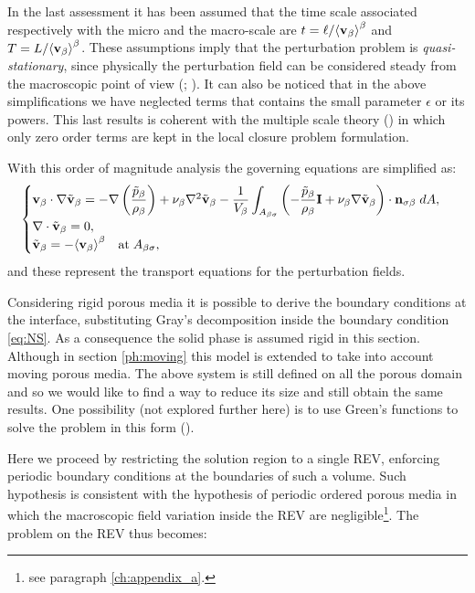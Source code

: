 In the last assessment it has been assumed that the time scale associated respectively with the micro and the macro-scale are $t = \ell/{\left< \textbf{v}_{\beta} \right>}^{\beta}$ and $T =L/{\left< \textbf{v}_{\beta} \right>}^{\beta}$.
These assumptions imply that the perturbation problem is \textit{quasi-stationary}, since physically the perturbation field can be considered steady from the macroscopic point of view (\citet{davit2013homogenization}; \citet{zhu2014study}).
It can also be noticed that in the above simplifications we have neglected terms that contains the small parameter $\epsilon$ or its powers. This last results is coherent with the multiple scale theory (\citet{mei2010homogenization}) in which only zero order terms are kept in the local closure problem formulation.

With this order of magnitude analysis the governing equations are simplified as:
\begin{eqnarray}
	\begin{cases}
		\textbf{v}_{\beta} \cdot \nabla \tilde{\textbf{v}}_{\beta} = -\nabla \left(\dfrac{\tilde{p}_{\beta}}{\rho_{\beta}}\right) + \nu_{\beta} \nabla^2 \tilde{\textbf{v}}_{\beta} - \dfrac{1}{V_\beta} \displaystyle \int_{A_{\beta \sigma}} \left(-\dfrac{\tilde{p}_{\beta}}{\rho_{\beta}} \mathbf{I}  + \nu_{\beta} \nabla \tilde{\textbf{v}}_{\beta} \right) \cdot \mathbf{n}_{\sigma \beta} \;dA,  \\
		\nabla \cdot \tilde{\textbf{v}}_{\beta} = 0,  \\
		\tilde{\textbf{v}}_{\beta} = -{\left< \textbf{v}_{\beta} \right>}^{\beta} \quad \textrm{at} \; A_{\beta \sigma},
	\end{cases}
\label{eq:vans_mom_}
\end{eqnarray}
and these represent the transport equations for the perturbation fields.

Considering rigid porous media it is possible to derive the boundary conditions at the interface, substituting Gray's decomposition inside the boundary condition  \eqref{eq:NS}. As a consequence the solid phase is assumed rigid in this section. Although in section \ref{ph:moving} this model is extended to take into account moving porous media.
The above system is still defined on all the porous domain and so we would like to find a way to reduce its size and still obtain the same results.
One possibility (not explored further here) is to use Green's functions to solve the problem in this form (\citet{wood2013volume}).

Here we proceed by restricting the solution region to a single REV, enforcing periodic boundary conditions at the boundaries of such a volume.
Such hypothesis is consistent with the hypothesis of periodic ordered porous media in which the macroscopic field variation inside the REV are negligible\footnote{see paragraph \ref{ch:appendix_a}.}.
The problem on the REV thus becomes:

